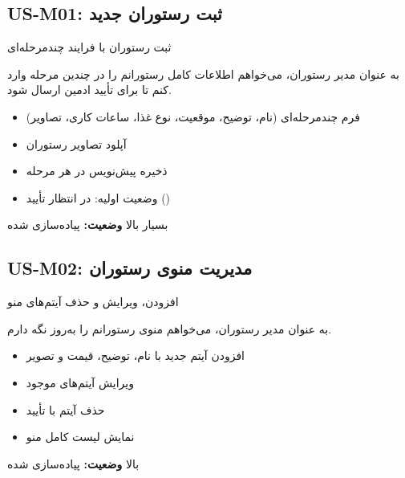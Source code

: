 \documentclass[12pt, a4paper]{article}
\begin{document}
\subsection{US-M01: ثبت رستوران جدید}
\begin{description}[rightmargin=0.5cm]
  \item[عنوان:] ثبت رستوران با فرایند چندمرحله‌ای
  \item[داستان:] به عنوان مدیر رستوران، می‌خواهم اطلاعات کامل رستورانم را در چندین مرحله
  وارد کنم تا برای تأیید ادمین ارسال شود.
  \item[معیارهای پذیرش:]
  \begin{itemize}[rightmargin=0.5cm]
    \item فرم چندمرحله‌ای (نام، توضیح، موقعیت، نوع غذا، ساعات کاری، تصاویر)
    \item آپلود تصاویر رستوران
    \item ذخیره پیش‌نویس در هر مرحله
    \item وضعیت اولیه: در انتظار تأیید ()
  \end{itemize}
  \item[اولویت:] بسیار بالا \quad \textbf{وضعیت:} پیاده‌سازی شده
\end{description}

\subsection{US-M02: مدیریت منوی رستوران}
\begin{description}[rightmargin=0.5cm]
  \item[عنوان:] افزودن، ویرایش و حذف آیتم‌های منو
  \item[داستان:] به عنوان مدیر رستوران، می‌خواهم منوی رستورانم را به‌روز نگه دارم.
  \item[معیارهای پذیرش:]
  \begin{itemize}[rightmargin=0.5cm]
    \item افزودن آیتم جدید با نام، توضیح، قیمت و تصویر
    \item ویرایش آیتم‌های موجود
    \item حذف آیتم با تأیید
    \item نمایش لیست کامل منو
  \end{itemize}
  \item[اولویت:] بالا \quad \textbf{وضعیت:} پیاده‌سازی شده
\end{description}
\end{document}
